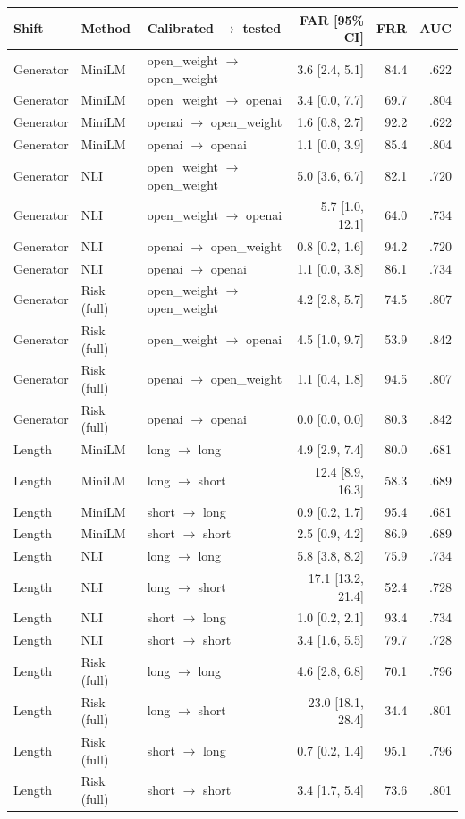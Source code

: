 \begin{tabular}{lllrrr}
\toprule
Shift & Method & Calibrated $\rightarrow$ tested & FAR [95\% CI] & FRR & AUC \\
\midrule
Generator & MiniLM & open\_weight $\rightarrow$ open\_weight & 3.6 [2.4, 5.1] & 84.4 & .622 \\
Generator & MiniLM & open\_weight $\rightarrow$ openai & 3.4 [0.0, 7.7] & 69.7 & .804 \\
Generator & MiniLM & openai $\rightarrow$ open\_weight & 1.6 [0.8, 2.7] & 92.2 & .622 \\
Generator & MiniLM & openai $\rightarrow$ openai & 1.1 [0.0, 3.9] & 85.4 & .804 \\
Generator & NLI & open\_weight $\rightarrow$ open\_weight & 5.0 [3.6, 6.7] & 82.1 & .720 \\
Generator & NLI & open\_weight $\rightarrow$ openai & 5.7 [1.0, 12.1] & 64.0 & .734 \\
Generator & NLI & openai $\rightarrow$ open\_weight & 0.8 [0.2, 1.6] & 94.2 & .720 \\
Generator & NLI & openai $\rightarrow$ openai & 1.1 [0.0, 3.8] & 86.1 & .734 \\
Generator & Risk (full) & open\_weight $\rightarrow$ open\_weight & 4.2 [2.8, 5.7] & 74.5 & .807 \\
Generator & Risk (full) & open\_weight $\rightarrow$ openai & 4.5 [1.0, 9.7] & 53.9 & .842 \\
Generator & Risk (full) & openai $\rightarrow$ open\_weight & 1.1 [0.4, 1.8] & 94.5 & .807 \\
Generator & Risk (full) & openai $\rightarrow$ openai & 0.0 [0.0, 0.0] & 80.3 & .842 \\
\midrule
Length & MiniLM & long $\rightarrow$ long & 4.9 [2.9, 7.4] & 80.0 & .681 \\
Length & MiniLM & long $\rightarrow$ short & 12.4 [8.9, 16.3] & 58.3 & .689 \\
Length & MiniLM & short $\rightarrow$ long & 0.9 [0.2, 1.7] & 95.4 & .681 \\
Length & MiniLM & short $\rightarrow$ short & 2.5 [0.9, 4.2] & 86.9 & .689 \\
Length & NLI & long $\rightarrow$ long & 5.8 [3.8, 8.2] & 75.9 & .734 \\
Length & NLI & long $\rightarrow$ short & 17.1 [13.2, 21.4] & 52.4 & .728 \\
Length & NLI & short $\rightarrow$ long & 1.0 [0.2, 2.1] & 93.4 & .734 \\
Length & NLI & short $\rightarrow$ short & 3.4 [1.6, 5.5] & 79.7 & .728 \\
Length & Risk (full) & long $\rightarrow$ long & 4.6 [2.8, 6.8] & 70.1 & .796 \\
Length & Risk (full) & long $\rightarrow$ short & 23.0 [18.1, 28.4] & 34.4 & .801 \\
Length & Risk (full) & short $\rightarrow$ long & 0.7 [0.2, 1.4] & 95.1 & .796 \\
Length & Risk (full) & short $\rightarrow$ short & 3.4 [1.7, 5.4] & 73.6 & .801 \\
\bottomrule
\end{tabular}

